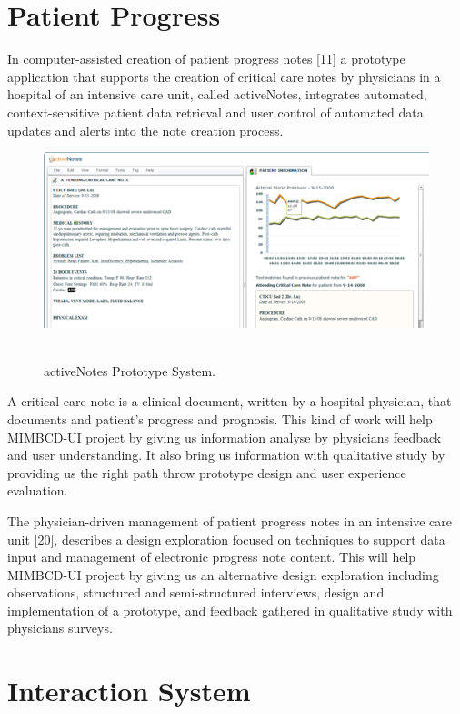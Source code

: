 \section{Patient Progress}

In computer-assisted creation of patient progress notes [11] a prototype application that supports the creation of critical care notes by physicians in a hospital of an intensive care unit, called activeNotes, integrates automated, context-sensitive patient data retrieval and user control of automated data updates and alerts into the note creation process.

\begin{figure}[!hbt]
\centering
\includegraphics[width=15cm]{images/activenotes}~\\
\caption{\label{fig:activenotes}activeNotes Prototype System.
}
\end{figure}

A critical care note is a clinical document, written by a hospital physician, that documents and patient's progress and prognosis. This kind of work will help MIMBCD-UI project by giving us information analyse by physicians feedback and user understanding. It also bring us information with qualitative study by providing us the right path throw prototype design and user experience evaluation.

The physician-driven management of patient progress notes in an intensive care unit [20], describes a design exploration focused on techniques to support data input and management of electronic progress note content. This will help MIMBCD-UI project by giving us an alternative design exploration including observations, structured and semi-structured interviews, design and implementation of a prototype, and feedback gathered in qualitative study with physicians surveys.

\section{Interaction System}

